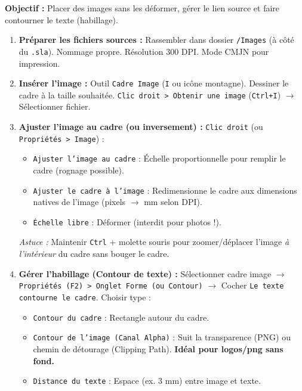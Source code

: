 \documentclass[11pt]{article}
\begin{document}
\begin{methode}
    \textbf{Objectif :} Placer des images sans les déformer, gérer le lien source et faire contourner le texte (habillage).
    \begin{enumerate}
        \item \textbf{Préparer les fichiers sources :} Rassembler dans dossier \texttt{/Images} (à côté du \texttt{.sla}). Nommage propre. Résolution $300$ DPI. Mode CMJN pour impression.
        \item \textbf{Insérer l'image :} Outil \texttt{Cadre Image} (\texttt{I} ou icône montagne). Dessiner le cadre à la taille souhaitée. \texttt{Clic droit > Obtenir une image} (\texttt{Ctrl+I}) $\rightarrow$ Sélectionner fichier.
        \item \textbf{Ajuster l'image au cadre (ou inversement) :} \texttt{Clic droit} (ou \texttt{Propriétés > Image}) :
              \begin{itemize}
                  \item \texttt{Ajuster l'image au cadre} : Échelle proportionnelle pour remplir le cadre (rognage possible).
                  \item \texttt{Ajuster le cadre à l'image} : Redimensionne le cadre aux dimensions natives de l'image (pixels $\rightarrow$ mm selon DPI).
                  \item \texttt{Échelle libre} : Déformer (interdit pour photos !).
              \end{itemize}
              \emph{Astuce :} Maintenir \texttt{Ctrl} + molette souris pour zoomer/déplacer l'image \emph{à l'intérieur} du cadre sans bouger le cadre.
        \item \textbf{Gérer l'habillage (Contour de texte) :} Sélectionner cadre image $\rightarrow$ \texttt{Propriétés (F2) > Onglet Forme (ou Contour)} $\rightarrow$ Cocher \texttt{Le texte contourne le cadre}. Choisir type :
              \begin{itemize}
                  \item \texttt{Contour du cadre} : Rectangle autour du cadre.
                  \item \texttt{Contour de l'image (Canal Alpha)} : Suit la transparence (PNG) ou chemin de détourage (Clipping Path). \textbf{Idéal pour logos/png sans fond.}
                  \item \texttt{Distance du texte} : Espace (ex. $3$ mm) entre image et texte.
              \end{itemize}

\end{enumerate}
\end{methode}
\end{document}
